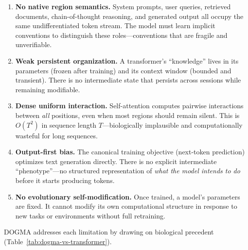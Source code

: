 \begin{enumerate}[leftmargin=1.8em]
  \item \textbf{No native region semantics.} System prompts, user queries, retrieved documents, chain-of-thought reasoning, and generated output all occupy the same undifferentiated token stream. The model must learn implicit conventions to distinguish these roles---conventions that are fragile and unverifiable.

  \item \textbf{Weak persistent organization.} A transformer's ``knowledge'' lives in its parameters (frozen after training) and its context window (bounded and transient). There is no intermediate state that persists across sessions while remaining modifiable.

  \item \textbf{Dense uniform interaction.} Self-attention computes pairwise interactions between \emph{all} positions, even when most regions should remain silent. This is $O(T^2)$ in sequence length $T$---biologically implausible and computationally wasteful for long sequences.

  \item \textbf{Output-first bias.} The canonical training objective (next-token prediction) optimizes text generation directly. There is no explicit intermediate ``phenotype''---no structured representation of \emph{what the model intends to do} before it starts producing tokens.

  \item \textbf{No evolutionary self-modification.} Once trained, a model's parameters are fixed. It cannot modify its own computational structure in response to new tasks or environments without full retraining.
\end{enumerate}

DOGMA addresses each limitation by drawing on biological precedent (Table~\ref{tab:dogma-vs-transformer}).

